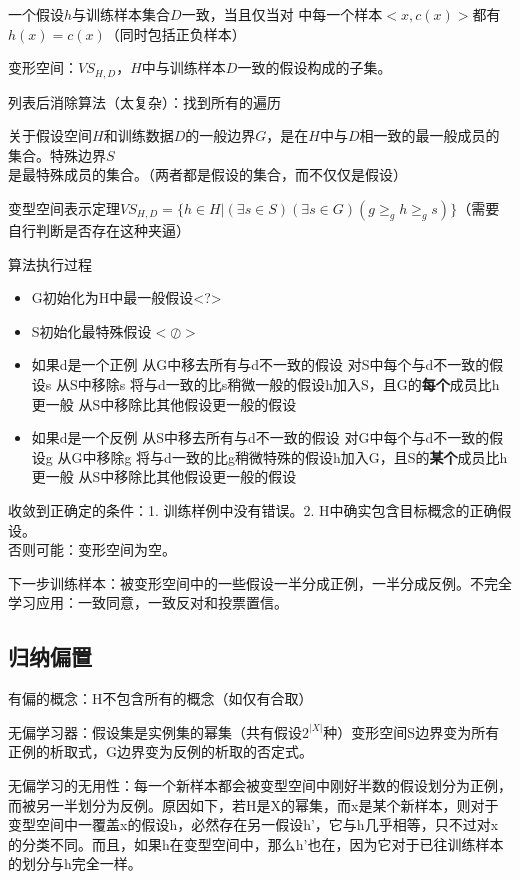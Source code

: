 \documentclass[UTF8,a4paper,landscape,16pt]{paper}
\begin{document}
\begin{multicols}{4}
\noindent 一个假设$h$与训练样本集合$D$一致，当且仅当对 中每一个样本$<x,c(x)>$都有$h(x)=c(x)$（同时包括正负样本）

\noindent 变形空间：$VS_{H,D}$，$H$中与训练样本$D$一致的假设构成的子集。

\noindent 列表后消除算法（太复杂）：找到所有的遍历

\noindent 关于假设空间$H$和训练数据$D$的一般边界$G$，是在$H$中与$D$相一致的最一般成员的集合。特殊边界$S$是最特殊成员的集合。（两者都是假设的集合，而不仅仅是假设）

\noindent 变型空间表示定理$VS_{H,D}=\{h\in H|(\exists s \in S)(\exists s \in G)(g \ge_g h \ge_g s)\}$（需要自行判断是否存在这种夹逼）

\noindent 算法执行过程\\
\begin{itemize}
\item G初始化为H中最一般假设<?>
\item S初始化最特殊假设$<\oslash>$
\item 如果d是一个正例
\subitem 从G中移去所有与d不一致的假设
\subitem 对S中每个与d不一致的假设s
\subsubitem 从S中移除s
\subsubitem 将与d一致的比s稍微一般的假设h加入S，且G的\textbf{每个}成员比h更一般
\subitem 从S中移除比其他假设更一般的假设
\item 如果d是一个反例
\subitem 从S中移去所有与d不一致的假设
\subitem 对G中每个与d不一致的假设g
\subsubitem 从G中移除g
\subsubitem 将与d一致的比g稍微特殊的假设h加入G，且S的\textbf{某个}成员比h更一般
\subitem 从S中移除比其他假设更一般的假设
\end{itemize}

\noindent 收敛到正确定的条件：1.
训练样例中没有错误。2. H中确实包含目标概念的正确假设。\\
否则可能：变形空间为空。

\noindent 下一步训练样本：被变形空间中的一些假设一半分成正例，一半分成反例。不完全学习应用：一致同意，一致反对和投票置信。

\subsection{归纳偏置}
\noindent 有偏的概念：H不包含所有的概念（如仅有合取）

\noindent 无偏学习器：假设集是实例集的幂集（共有假设$2^{|X|}$种）变形空间S边界变为所有正例的析取式，G边界变为反例的析取的否定式。

\noindent 无偏学习的无用性：每一个新样本都会被变型空间中刚好半数的假设划分为正例，而被另一半划分为反例。原因如下，若H是X的幂集，而x是某个新样本，则对于变型空间中一覆盖x的假设h，必然存在另一假设h'，它与h几乎相等，只不过对x的分类不同。而且，如果h在变型空间中，那么h'也在，因为它对于已往训练样本的划分与h完全一样。


\end{multicols}
\end{document}
